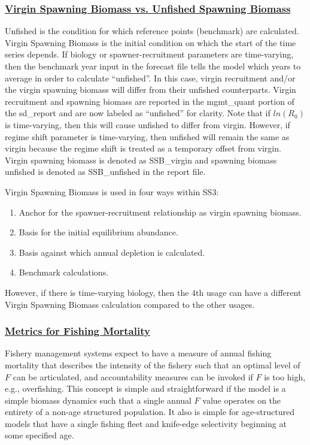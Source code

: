 \subsubsection[Virgin Spawning Biomass vs. Unfished Spawning Biomass]{\protect\hyperlink{VirginUnfished}{Virgin Spawning Biomass vs. Unfished Spawning Biomass}}
Unfished is the condition for which reference points (benchmark) are calculated. Virgin Spawning Biomass is the initial condition on which the start of the time series depends. If biology or spawner-recruitment parameters are time-varying, then the benchmark year input in the forecast file tells the model which years to average in order to calculate ``unfished''. In this case, virgin recruitment and/or the virgin spawning biomass will differ from their unfished counterparts. Virgin recruitment and spawning biomass are reported in the mgmt\_quant portion of the sd\_report and are now labeled as ``unfished'' for clarity. Note that if $ln(R_{0})$ is time-varying, then this will cause unfished to differ from virgin. However, if regime shift parameter is time-varying, then unfished will remain the same as virgin because the regime shift is treated as a temporary offset from virgin. Virgin spawning biomass is denoted as SSB\_virgin and spawning biomass unfished is denoted as SSB\_unfished in the report file.

Virgin Spawning Biomass is used in four ways within SS3:
\begin{enumerate}
	\item Anchor for the spawner-recruitment relationship as virgin spawning biomass.
	\item Basis for the initial equilibrium abundance. 
	\item Basis against which annual depletion is calculated.
	\item Benchmark calculations.
\end{enumerate}
However, if there is time-varying biology, then the 4th usage can have a different Virgin Spawning Biomass calculation compared to the other usages.

\hypertarget{FMortality}{}
\subsubsection[Metrics for Fishing Mortality]{\protect\hyperlink{FMortality}{Metrics for Fishing Mortality}}
Fishery management systems expect to have a measure of annual fishing mortality that describes the intensity of the fishery such that an optimal level of $F$ can be articulated, and accountability measures can be invoked if $F$ is too high, e.g., overfishing. This concept is simple and straightforward if the model is a simple biomass dynamics such that a single annual $F$ value operates on the entirety of a non-age structured population. It also is simple for age-structured models that have a single fishing fleet and knife-edge selectivity beginning at some specified age.

